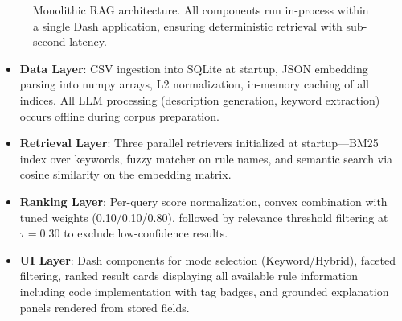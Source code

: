 \begin{figure}[H]
\caption{Monolithic RAG architecture. All components run in-process within a single Dash application, ensuring deterministic retrieval with sub-second latency.}\label{fig:intro-architecture}
\end{figure}

\begin{itemize}[leftmargin=*,itemsep=2pt,topsep=2pt]
 \item \textbf{Data Layer}: CSV ingestion into SQLite at startup, JSON embedding parsing into numpy arrays, L2 normalization, in-memory caching of all indices. All LLM processing (description generation, keyword extraction) occurs offline during corpus preparation.
 \item \textbf{Retrieval Layer}: Three parallel retrievers initialized at startup—BM25 index \cite{robertson2009bm25} over keywords, fuzzy matcher \cite{fuzzywuzzy2011} on rule names, and semantic search via cosine similarity on the embedding matrix. 
 \item \textbf{Ranking Layer}: Per-query score normalization, convex combination with tuned weights (0.10/0.10/0.80), followed by relevance threshold filtering at $\tau=0.30$ to exclude low-confidence results.
 \item \textbf{UI Layer}: Dash components for mode selection (Keyword/Hybrid), faceted filtering, ranked result cards displaying all available rule information including code implementation with tag badges, and grounded explanation panels rendered from stored fields.
\end{itemize}
